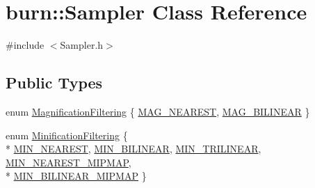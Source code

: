 \hypertarget{classburn_1_1_sampler}{\section{burn\-:\-:Sampler Class Reference}
\label{classburn_1_1_sampler}
}


{\ttfamily \#include $<$Sampler.\-h$>$}

\subsection*{Public Types}
\begin{DoxyCompactItemize}
\item 
enum \hyperlink{classburn_1_1_sampler_a09433eae16f8623591d415a3f8c6afec}{Magnification\-Filtering} \{ \hyperlink{classburn_1_1_sampler_a09433eae16f8623591d415a3f8c6afeca686313d0b445f86b99fc81ca846d106f}{M\-A\-G\-\_\-\-N\-E\-A\-R\-E\-S\-T}, 
\hyperlink{classburn_1_1_sampler_a09433eae16f8623591d415a3f8c6afecad578e8d60f86e9d2189a318edc5c39aa}{M\-A\-G\-\_\-\-B\-I\-L\-I\-N\-E\-A\-R}
 \}
\item 
enum \hyperlink{classburn_1_1_sampler_a09d6e36f45577a56ce230549aeaaab10}{Minification\-Filtering} \{ \\*
\hyperlink{classburn_1_1_sampler_a09d6e36f45577a56ce230549aeaaab10a61c7cb4ef3f10c21b6b085d1872f38f6}{M\-I\-N\-\_\-\-N\-E\-A\-R\-E\-S\-T}, 
\hyperlink{classburn_1_1_sampler_a09d6e36f45577a56ce230549aeaaab10a47e352b7d042db353d893235313d966f}{M\-I\-N\-\_\-\-B\-I\-L\-I\-N\-E\-A\-R}, 
\hyperlink{classburn_1_1_sampler_a09d6e36f45577a56ce230549aeaaab10a117a2dc8277823c30ae52ea0b6382009}{M\-I\-N\-\_\-\-T\-R\-I\-L\-I\-N\-E\-A\-R}, 
\hyperlink{classburn_1_1_sampler_a09d6e36f45577a56ce230549aeaaab10ad73bad33e321c29883fb10d992d96b7b}{M\-I\-N\-\_\-\-N\-E\-A\-R\-E\-S\-T\-\_\-\-M\-I\-P\-M\-A\-P}, 
\\*
\hyperlink{classburn_1_1_sampler_a09d6e36f45577a56ce230549aeaaab10ab216362260b08920589fc442fa021e32}{M\-I\-N\-\_\-\-B\-I\-L\-I\-N\-E\-A\-R\-\_\-\-M\-I\-P\-M\-A\-P}
 \}
\end{DoxyCompactItemize}
